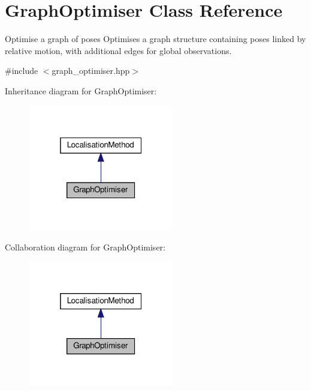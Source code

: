 \hypertarget{classGraphOptimiser}{}\section{Graph\+Optimiser Class Reference}
\label{classGraphOptimiser}


Optimise a graph of poses Optimises a graph structure containing poses linked by relative motion, with additional edges for global observations.  




{\ttfamily \#include $<$graph\+\_\+optimiser.\+hpp$>$}



Inheritance diagram for Graph\+Optimiser\+:
\nopagebreak
\begin{figure}[H]
\begin{center}
\leavevmode
\includegraphics[width=181pt]{classGraphOptimiser__inherit__graph}
\end{center}
\end{figure}


Collaboration diagram for Graph\+Optimiser\+:
\nopagebreak
\begin{figure}[H]
\begin{center}
\leavevmode
\includegraphics[width=181pt]{classGraphOptimiser__coll__graph}
\end{center}
\end{figure}
